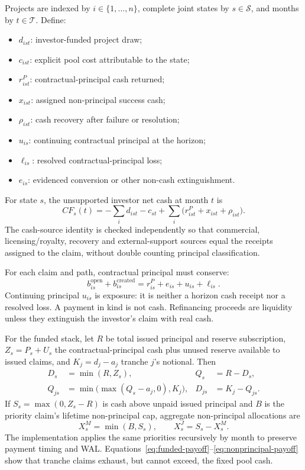 \documentclass[11pt,a4paper]{article}
\begin{document}
Projects are indexed by \(i\in\{1,\ldots,n\}\), complete joint states by \(s\in\mathcal S\), and months by \(t\in\mathcal T\). Define:

\begin{itemize}
  \item \(d_{ist}\): investor-funded project draw;
  \item \(c_{ist}\): explicit pool cost attributable to the state;
  \item \(r^{P}_{ist}\): contractual-principal cash returned;
  \item \(x_{ist}\): assigned non-principal success cash;
  \item \(\rho_{ist}\): cash recovery after failure or resolution;
  \item \(u_{is}\): continuing contractual principal at the horizon;
  \item \(\ell_{is}\): resolved contractual-principal loss;
  \item \(e_{is}\): evidenced conversion or other non-cash extinguishment.
\end{itemize}

For state \(s\), the unsupported investor net cash at month \(t\) is
\begin{equation}
CF_s(t)=-\sum_i d_{ist}-c_{st}+\sum_i\bigl(r^{P}_{ist}+x_{ist}+\rho_{ist}\bigr).
\label{eq:cashflow}
\end{equation}
The cash-source identity is checked independently so that commercial, licensing/royalty, recovery and external-support sources equal the receipts assigned to the claim, without double counting principal classification.

For each claim and path, contractual principal must conserve:
\begin{equation}
b^{\mathrm{open}}_{is}+b^{\mathrm{created}}_{is}
=r^{P}_{is}+e_{is}+u_{is}+\ell_{is}.
\label{eq:principal}
\end{equation}
Continuing principal \(u_{is}\) is exposure: it is neither a horizon cash receipt nor a resolved loss. A payment in kind is not cash. Refinancing proceeds are liquidity unless they extinguish the investor's claim with real cash.

For the funded stack, let \(R\) be total issued principal and reserve subscription, \(Z_s=P_s+U_s\) the contractual-principal cash plus unused reserve available to issued claims, and \(K_j=d_j-a_j\) tranche \(j\)'s notional. Then
\begin{align}
D_s&=\min(R,Z_s), & Q_s&=R-D_s,\\
Q_{js}&=\min\!\bigl(\max(Q_s-a_j,0),K_j\bigr),
&D_{js}&=K_j-Q_{js}.
\label{eq:funded-payoff}
\end{align}
If \(S_s=\max(0,Z_s-R)\) is cash above unpaid issued principal and \(B\) is the priority claim's lifetime non-principal cap, aggregate non-principal allocations are
\begin{equation}
X_s^{M}=\min(B,S_s),\qquad X_s^{J}=S_s-X_s^{M}.
\label{eq:nonprincipal-payoff}
\end{equation}
The implementation applies the same priorities recursively by month to preserve payment timing and WAL. Equations~\eqref{eq:funded-payoff}--\eqref{eq:nonprincipal-payoff} show that tranche claims exhaust, but cannot exceed, the fixed pool cash.
\end{document}
